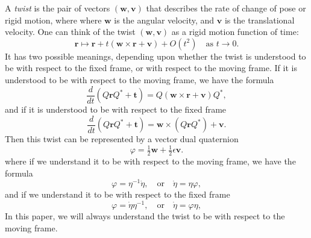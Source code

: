 \documentclass[reqno,12pt]{amsart}
\begin{document}
A \emph{twist} is the pair of vectors $(\bm w, \bm v)$ that describes the rate of change of pose or rigid motion, where where $\bm w$ is the angular velocity, and $\bm v$ is the translational velocity.  One can think of the twist $(\bm w, \bm v)$ as a rigid motion function of time:
\begin{equation}
\bm r \mapsto \bm r + t (\bm w \times \bm r + \bm v) + O(t^2) \quad \text{as $t \to 0$} .
\end{equation}
It has two possible meanings, depending upon whether the twist is understood to be with respect to the fixed frame, or with respect to the moving frame.  If it is understood to be with respect to the moving frame, we have the formula
\begin{equation}
\label{ode twist}
\frac d{dt} (Q \bm r Q^* + \bm t) = Q (\bm w \times \bm r + \bm v) Q^* ,
\end{equation}
and if it is understood to be with respect to the fixed frame
\begin{equation}
\label{ode twist fixed}
\frac d{dt} (Q \bm r Q^* + \bm t) = \bm w \times (Q \bm r Q^*) + \bm v .
\end{equation}
Then this twist can be represented by a vector dual quaternion \cite{adorno, agrawal}
\begin{equation}
\label{twist as dual quaternion}
\varphi = \tfrac12 \bm w + \tfrac12 \epsilon \bm v .
\end{equation}
where if we understand it to be with respect to the moving frame, we have the formula
\begin{equation}
\label{ode dual quaternion fixed}
\varphi = \eta^{-1} \dot \eta, \quad\text{or}\quad\dot \eta = \eta \varphi ,
\end{equation}
and if we understand it to be with respect to the fixed frame
\begin{equation}
\label{ode dual quaternion}
\varphi = \dot \eta \eta^{-1}, \quad\text{or}\quad\dot \eta = \varphi \eta ,
\end{equation}
In this paper, we will always understand the twist to be with respect to the moving frame.
\end{document}
